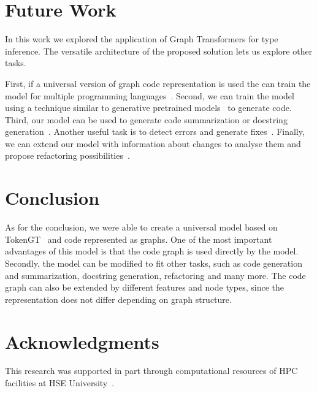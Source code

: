 \documentclass[conference]{IEEEtran}
\begin{document}
\section{Future Work}\label{sec:future-work}

In this work we explored the application of Graph Transformers for type inference.
The versatile architecture of the proposed solution lets us explore other tasks.

First, if a universal version of graph code representation is used the can train the model for multiple programming languages~\cite{wang_unified_2022}.
Second, we can train the model using a technique similar to generative pretrained models~\cite{radford_language_2019,brown_language_2020} to generate code.
Third, our model can be used to generate code summarization or docstring generation~\cite{barone_parallel_2017,liu_haconvgnn_2021}.
Another useful task is to detect errors and generate fixes~\cite{bhatia_automated_2016,fujimoto_addressing_2018,marginean_sapfix_2019}.
Finally, we can extend our model with information about changes to analyse them and propose refactoring possibilities~\cite{cabrera_lozoya_commit2vec_2021}.

\section{Conclusion}\label{sec:conclusion}

As for the conclusion, we were able to create a universal model based on TokenGT~\cite{kim_pure_2022} and code represented as graphs.
One of the most important advantages of this model is that the code graph is used directly by the model.
Secondly, the model can be modified to fit other tasks, such as code generation and summarization, docstring generation, refactoring and many more.
The code graph can also be extended by different features and node types, since the representation does not differ depending on graph structure.

\section{Acknowledgments}\label{sec:acknowledgments}

This research was supported in part through computational resources of HPC facilities at HSE University~\cite{kostenetskiy_hpc_2021}.

\printbibliography
\end{document}
